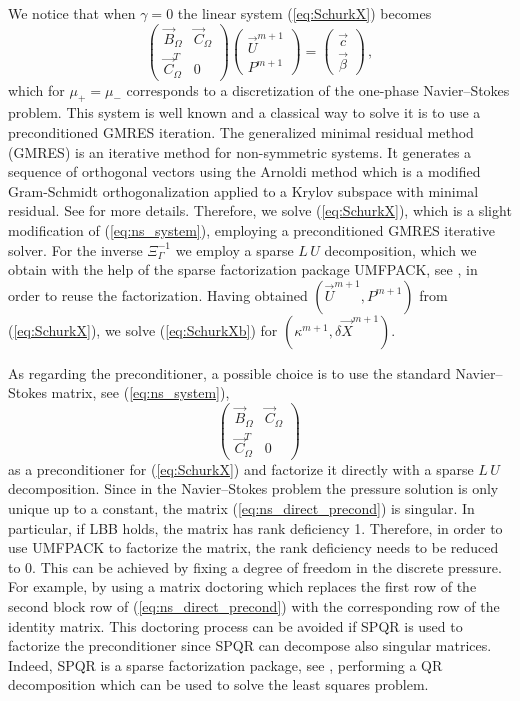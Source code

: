 \documentclass[a4paper,12pt,onecolumn]{article}
\begin{document}
We notice that when $\gamma = 0$ the linear system (\ref{eq:SchurkX}) becomes
\begin{equation} \label{eq:ns_system}
\begin{pmatrix}
\vec B_\Omega & \vec C_\Omega \\
\vec C_\Omega^T & 0
\end{pmatrix}
\begin{pmatrix}
\vec U^{m+1} \\ P^{m+1}
\end{pmatrix}
= \begin{pmatrix}
\vec c \\
\vec \beta
\end{pmatrix}\,,
\end{equation}
which for $\mu_+=\mu_-$ corresponds to a discretization of the one-phase
Navier--Stokes problem. This system is well known and a classical way to solve
it is to use a preconditioned GMRES iteration. The generalized minimal residual
method (GMRES) is an iterative method for non-symmetric systems. It generates a
sequence of orthogonal vectors using the Arnoldi method which is a modified
Gram-Schmidt orthogonalization applied to a Krylov subspace with minimal
residual. See \cite{BarrettBCetal94} for more details. Therefore, we solve
(\ref{eq:SchurkX}), which is a slight modification of (\ref{eq:ns_system}),
employing a preconditioned GMRES iterative solver. For the inverse
$\Xi_\Gamma^{-1}$ we employ a sparse $L\,U$ decomposition, which we obtain with
the help of the sparse factorization package UMFPACK, see \cite{Davis04}, in
order to reuse the factorization. Having obtained $(\vec U^{m+1}, P^{m+1})$ from
(\ref{eq:SchurkX}), we solve (\ref{eq:SchurkXb}) for $(\kappa^{m+1}, \delta\vec
X^{m+1})$.

As regarding the preconditioner, a possible choice is to use the standard
Navier--Stokes matrix, see (\ref{eq:ns_system}),
\begin{equation}\label{eq:ns_direct_precond}
\begin{pmatrix}
\vec B_\Omega & \vec C_\Omega \\
\vec C_\Omega^T & 0
\end{pmatrix}\,
\end{equation}
as a preconditioner for (\ref{eq:SchurkX}) and factorize it directly with a
sparse $L\,U$ decomposition. Since in the Navier--Stokes problem the pressure
solution is only unique up to a constant, the matrix
(\ref{eq:ns_direct_precond}) is singular. In particular, if LBB holds, the
matrix has rank deficiency 1. Therefore, in order to use UMFPACK to factorize
the matrix, the rank deficiency needs to be reduced to 0. This can be achieved
by fixing a degree of freedom in the discrete pressure. For example, by
using a matrix doctoring which replaces the first row of the second block row
of (\ref{eq:ns_direct_precond}) with the corresponding row of the identity
matrix. This doctoring process can be avoided if SPQR is used to factorize the
preconditioner since SPQR can decompose also singular matrices. Indeed, SPQR is
a sparse factorization package, see \cite{Davis11}, performing a QR
decomposition which can be used to solve the least squares problem.
\end{document}
